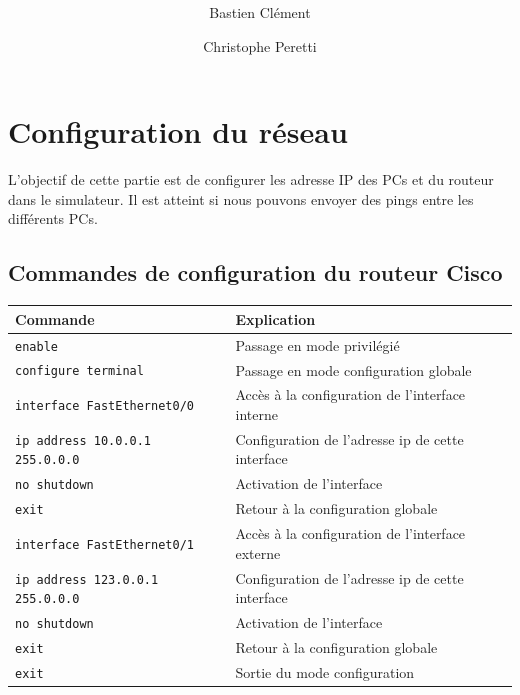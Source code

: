 \documentclass[11pt,a4paper]{article}
\author{Bastien Clément \and Christophe Peretti}
\title{{\normalsize \doccourse} \\ \doctitle }
\begin{document}
\maketitle
\vspace{1em}
\vspace{1.2cm}

\section{Configuration du réseau}

L'objectif de cette partie est de configurer les adresse IP des PCs et du routeur dans le simulateur. Il est atteint si nous pouvons envoyer des pings entre les différents PCs.

\subsection{Commandes de configuration du routeur Cisco}

\begin{tabular}{|l|l|}
	\hline	
	\textbf{Commande} & \textbf{Explication}  \\
	\hline
	\texttt{enable} & Passage en mode privilégié\\
	\texttt{configure terminal} & Passage en mode configuration globale\\
	\hline
	\texttt{interface FastEthernet0/0} & Accès à la configuration de l'interface interne\\
	\texttt{ip address 10.0.0.1 255.0.0.0} & Configuration de l'adresse ip de cette interface\\
	\texttt{no shutdown} & Activation de l'interface \\
	\texttt{exit} & Retour à la configuration globale \\
	\hline
	\texttt{interface FastEthernet0/1} & Accès à la configuration de l'interface externe \\
	\texttt{ip address 123.0.0.1 255.0.0.0} & Configuration de l'adresse ip de cette interface \\
	\texttt{no shutdown} & Activation de l'interface \\
	\texttt{exit} & Retour à la configuration globale \\
	\hline
	\texttt{exit} & Sortie du mode configuration \\
	\hline
\end{tabular}

\end{document}
